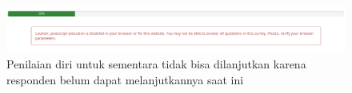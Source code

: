 \begin{figure}
   \begin{center}
     \includegraphics[scale=.35]{pics/gakBsLanjut.png}
     \caption{Penilaian diri untuk sementara tidak bisa dilanjutkan karena responden belum dapat melanjutkannya saat ini}
     \label{fig:gakBsLanjut}
   \end{center}
 \end{figure}
